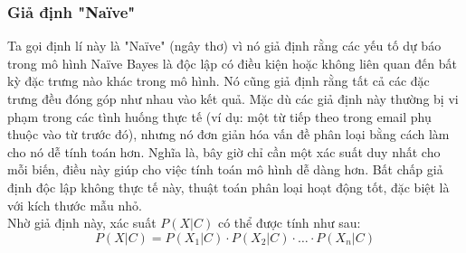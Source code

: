 \subsubsection{Giả định "Naïve"}
Ta gọi định lí này là "Naïve" (ngây thơ) vì  nó giả định rằng các yếu tố dự báo trong mô hình Naïve Bayes là độc lập có điều kiện hoặc không liên quan đến bất kỳ đặc trưng nào khác trong mô hình. Nó cũng giả định rằng tất cả các đặc trưng đều đóng góp như nhau vào kết quả. Mặc dù các giả định này thường bị vi phạm trong các tình huống thực tế (ví dụ: một từ tiếp theo trong email phụ thuộc vào từ trước đó), nhưng nó đơn giản hóa vấn đề phân loại bằng cách làm cho nó dễ tính toán hơn. Nghĩa là, bây giờ chỉ cần một xác suất duy nhất cho mỗi biến, điều này giúp cho việc tính toán mô hình dễ dàng hơn. Bất chấp giả định độc lập không thực tế này, thuật toán phân loại hoạt động tốt, đặc biệt là với kích thước mẫu nhỏ. \\
Nhờ giả định này, xác suất \(P(X|C)\) có thể được tính như sau:\
\[P(X|C) = P(X_1|C) \cdot P(X_2|C) \cdot \ldots \cdot P(X_n|C)\]
